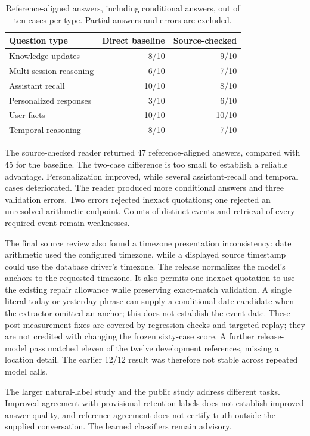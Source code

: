 \begin{table}[htbp]
\centering
\begin{tabular}{lrr}
\toprule
Question type & Direct baseline & Source-checked\\
\midrule
Knowledge updates & 8/10 & 9/10 \\
Multi-session reasoning & 6/10 & 7/10 \\
Assistant recall & 10/10 & 8/10 \\
Personalized responses & 3/10 & 6/10 \\
User facts & 10/10 & 10/10 \\
Temporal reasoning & 8/10 & 7/10 \\
\bottomrule
\end{tabular}
\caption{Reference-aligned answers, including conditional answers, out of ten
cases per type. Partial answers and errors are excluded.}
\end{table}

The source-checked reader returned 47 reference-aligned answers, compared with
45 for the baseline. The two-case difference is too small to establish a
reliable advantage. Personalization improved, while several assistant-recall
and temporal cases deteriorated. The reader produced more conditional answers
and three validation errors. Two errors rejected inexact quotations; one
rejected an unresolved arithmetic endpoint. Counts of distinct events and
retrieval of every required event remain weaknesses.

The final source review also found a timezone presentation inconsistency: date
arithmetic used the configured timezone, while a displayed source timestamp
could use the database driver's timezone. The release normalizes the model's
anchors to the requested timezone. It also permits one inexact quotation to use
the existing repair allowance while preserving exact-match validation. A single
literal today or yesterday phrase can supply a conditional date candidate when
the extractor omitted an anchor; this does not establish the event date. These
post-measurement fixes are covered by regression checks and targeted replay;
they are not credited with changing the frozen sixty-case score. A further
release-model pass matched eleven of the twelve development references,
missing a location detail. The earlier 12/12 result was therefore not stable
across repeated model calls.

The larger natural-label study and the public study address different tasks.
Improved agreement with provisional retention labels does not establish improved
answer quality, and reference agreement does not certify truth outside the
supplied conversation. The learned classifiers remain advisory.
